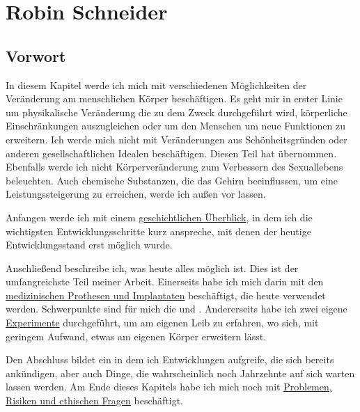 \chapter{Robin Schneider}
\label{sec:Robin_Schneider}


\section{Vorwort}
In diesem Kapitel werde ich mich mit verschiedenen Möglichkeiten der Veränderung am menschlichen Körper beschäftigen.
Es geht mir in erster Linie um physikalische Veränderung die zu dem Zweck durchgeführt wird,
körperliche Einschränkungen auszugleichen oder um den Menschen um neue Funktionen zu erweitern.
Ich werde mich nicht mit Veränderungen aus Schönheitsgründen
oder anderen gesellschaftlichen Idealen beschäftigen.
Diesen Teil hat  übernommen.
Ebenfalls werde ich nicht Körperveränderung zum Verbessern des Sexuallebens beleuchten.
Auch chemische Substanzen, die das Gehirn beeinflussen,
um eine Leistungssteigerung zu erreichen, werde ich außen vor lassen.


\bigskip
Anfangen werde ich mit einem \hyperref[sec:Robin:historical_overview]{geschichtlichen Überblick},
in dem ich die wichtigsten Entwicklungsschritte kurz anspreche, mit denen der heutige
Entwicklungsstand erst möglich wurde.

Anschließend beschreibe ich, was heute alles möglich ist.
Dies ist der umfangreichste Teil meiner Arbeit. Einerseits habe ich mich darin mit den
\hyperref[sec:Robin:topical]{medizinischen Prothesen und Implantaten} beschäftigt, die heute
verwendet werden. Schwerpunkte sind für mich die
 und .
Andererseits habe ich zwei eigene \hyperref[sec:Robin:experiments]{Experimente} durchgeführt, um am
eigenen Leib zu erfahren, wo sich, mit geringem Aufwand, etwas am eigenen Körper erweitern lässt.

Den Abschluss bildet ein  in dem ich Entwicklungen aufgreife, die sich
bereits ankündigen, aber auch Dinge, die wahrscheinlich noch Jahrzehnte auf sich warten lassen
werden. Am Ende dieses Kapitels habe ich mich noch mit
\hyperref[sec:Robin:future:problems]{Problemen,
Risiken und ethischen Fragen} beschäftigt.











\nocite{
	Spektrum:Weg_zu_intelligenten_Prothesen,
	thesis:Cyborg,
	Stern:pacemaker,
	Heise:Telepolis:Mensch:Cyborg,
	Medica:Handprothese_Wandel_der_Zeit,
}

\printbibliography[heading=source,keyword=Robin]
